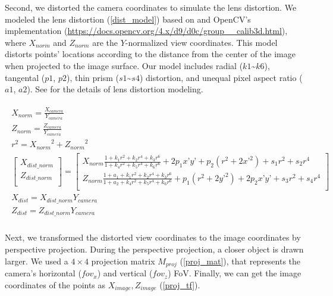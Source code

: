 \documentclass{article}
\begin{document}
Second, we distorted the camera coordinates to simulate the lens distortion. We modeled the lens distortion (\ref{dist_model}) based on \cite{Weng1992CameraCalib} and OpenCV's implementation (\url{https://docs.opencv.org/4.x/d9/d0c/group__calib3d.html}), where \(X_{norm}\) and \(Z_{norm}\) are the \(Y\)-normalized view coordinates. This model distorts points' locations according to the distance from the center of the image when projected to the image surface. Our model includes radial (\(k1\)\textasciitilde{}\(k6\)), tangental (\(p1\), \(p2\)), thin prism (\(s1\)\textasciitilde{}\(s4\)) distortion, and unequal pixel aspect ratio (\(a1\), \(a2\)). See \cite{Weng1992CameraCalib} for the details of lens distortion modeling.

\begin{gather}
\label{dist_model}
  \begin{gathered}
  X_{norm} = \frac{X_{camera}}{Y_{camera}} \\
  Z_{norm} = \frac{Z_{camera}}{Y_{camera}} \\
  r^2 = {X_{norm}}^2 + {Z_{norm}}^2 \\
  \begin{bmatrix}
    X_{dist\_norm} \\ 
    Z_{dist\_norm} \\
  \end{bmatrix} 
  = 
  \begin{bmatrix} 
    X_{norm} \frac{1 + k_1 r^2 + k_2 r^4 + k_3 r^6}{1 + k_4 r^2 + k_5 r^4 + k_6 r^6} + 2 p_1 x’ y’ + p_2(r^2 + 2 x’^2) + s_1 r^2 + s_2 r^4 \\ 
    Z_{norm} \frac{1 + a_1 + k_1 r^2 + k_2 r^4 + k_3 r^6}{1 + a_2 + k_4 r^2 + k_5 r^4 + k_6 r^6} + p_1 (r^2 + 2 y’^2) + 2 p_2 x’ y’ + s_3 r^2 + s_4 r^4 \\    \end{bmatrix} \\
  X_{dist} = X_{dist\_norm} Y_{camera} \\
  Z_{dist} = Z_{dist\_norm} Y_{camera} \\
  \end{gathered}
\end{gather}

Next, we transformed the distorted view coordinates to the image coordinates by perspective projection. During the perspective projection, a closer object is drawn larger. We used a \(4 \times 4\) projection matrix \(M_{proj}\) (\ref{proj_mat}), that represents the camera's horizontal (\(fov_x\)) and vertical (\(fov_z\)) FoV. Finally, we can get the image coordinates of the points as \(X_{image}, Z_{image}\) (\ref{proj_tf}).
\end{document}
